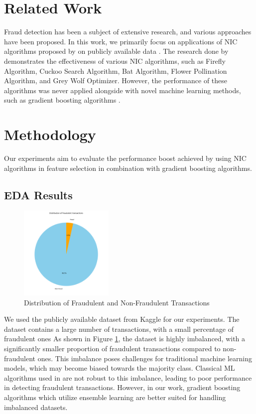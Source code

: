 \documentclass[conference]{IEEEtran}
\begin{document}
\section{Related Work}
Fraud detection has been a subject of extensive research,
and various approaches have been proposed. In this
work, we primarily focus on applications of NIC algorithms
proposed by \cite{github} on publicly available data \cite{dataset}.
The research done by \cite{github}
demonstrates the effectiveness of various NIC algorithms, such as
Firefly Algorithm, Cuckoo Search Algorithm, Bat Algorithm,
Flower Pollination Algorithm, and Grey Wolf Optimizer. However,
the performance of these algorithms was never applied alongside
with novel machine learning methods, such as gradient boosting
algorithms \cite{xgboost, catboost, lightgbm}.

\section{Methodology}
Our experiments aim to evaluate the performance boost achieved
by using NIC algorithms in feature selection in combination with
gradient boosting algorithms.

\subsection{EDA Results}

\begin{figure}[H]
	\centering
	\includegraphics[width=0.4\textwidth]{fraud_pie.png}
	\caption{Distribution of Fraudulent and Non-Fraudulent Transactions}
	\label{fig:fraud_pie}
\end{figure}

We used the publicly available dataset from Kaggle \cite{dataset}
for our experiments. The dataset contains a large number of
transactions, with a small percentage of fraudulent ones
As shown in Figure \ref{fig:fraud_pie}, the dataset is highly
imbalanced, with a significantly smaller proportion of fraudulent
transactions compared to non-fraudulent ones.
This imbalance poses challenges for traditional machine
learning models, which may become biased towards the majority class.
Classical ML algorithms used in \cite{github} are not robust 
to this imbalance, leading to poor performance in detecting
fraudulent transactions. However, in our work, 
gradient boosting algorithms which utilize ensemble learning
are better suited for handling imbalanced datasets.
\end{document}
